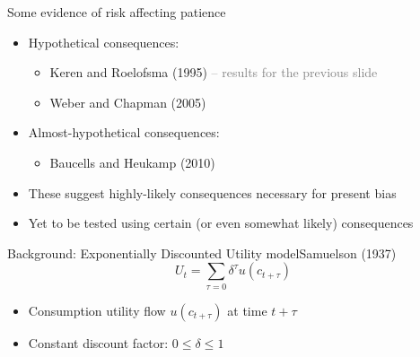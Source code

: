 \documentclass[professionalfont,10pt]{beamer}
\begin{document}
\begin{frame}{Some evidence of risk affecting patience}
\begin{itemize}
\item<1-> Hypothetical consequences:
\begin{itemize}
\item<2-> Keren and Roelofsma (1995) \textcolor{gray}{-- results for the previous slide}
\item<3-> Weber and Chapman (2005)
\end{itemize}
\vspace{2em}
\item<4-> Almost-hypothetical consequences:
\begin{itemize}
\item <5->Baucells and Heukamp (2010) 
\end{itemize}
\vspace{2em}
\item<7-> These suggest highly-likely consequences necessary for present bias
\item<8-> Yet to be tested using certain (or even somewhat likely) consequences
\end{itemize}
\end{frame}

\begin{frame}{Background: Exponentially Discounted Utility model}{Samuelson (1937)}
$$U_t = \sum_{\tau=0} \delta^\tau u(c_{t+\tau})$$
\vspace{2\baselineskip}
\begin{itemize}
\item<2-> Consumption utility flow $u(c_{t+\tau})$ at time ${t+\tau}$
\vspace{1\baselineskip}
\item<3-> Constant discount factor: $0\leq \delta \leq 1$
\end{itemize}
\end{frame}
\end{document}
